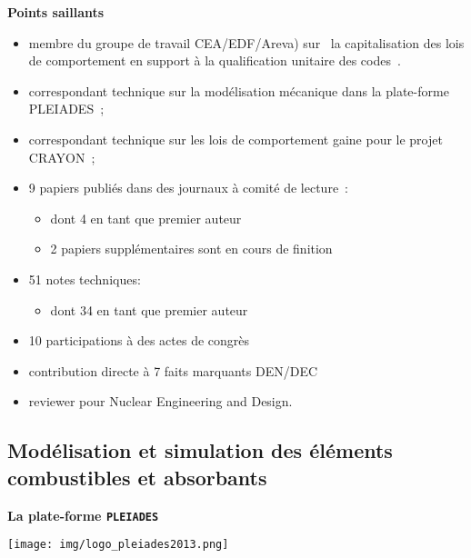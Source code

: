 \documentclass[11pt,a4paper]{moderncv}
\let\origsubsection\subsection%
\let\subsection\section%
\let\subsection\origsubsection%
\newcommand{\paragraph}[1]{\textbf{#1}}
\begin{document}
\paragraph{Points saillants}

\begin{itemize}
\item membre du groupe de travail CEA/EDF/Areva) sur \og{}~la
  capitalisation des lois de comportement en support à la
  qualification unitaire des codes~\fg{}.
\item correspondant technique sur la modélisation mécanique dans la
  plate-forme PLEIADES~;
\item correspondant technique sur les lois de comportement gaine pour
  le projet CRAYON~;
\item 9 papiers publiés dans des journaux à comité de lecture~:
  \begin{itemize}
  \item dont 4 en tant que premier auteur
  \item 2 papiers supplémentaires sont en cours de finition
  \end{itemize}
\item 51 notes techniques:
  \begin{itemize}
  \item dont 34 en tant que premier auteur
  \end{itemize}
\item 10 participations à des actes de congrès
\item contribution directe à 7 faits marquants DEN/DEC
\item reviewer pour Nuclear Engineering and Design.
\end{itemize}

\subsection{Modélisation et simulation des éléments combustibles et absorbants}

\paragraph{La plate-forme \texttt{PLEIADES}}

\begin{center}
  \texttt{[image: img/logo\_pleiades2013.png]}
\end{center}

\end{document}
